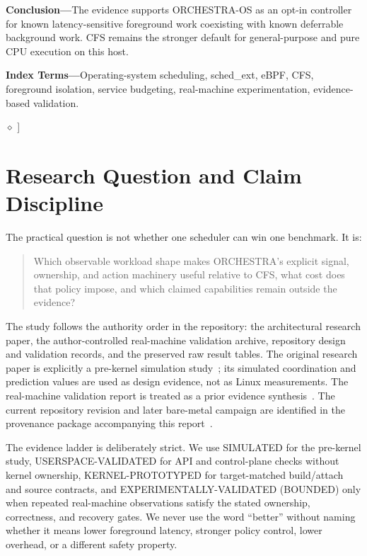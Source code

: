 \documentclass[10pt,letterpaper,twocolumn]{article}
\newcommand{\ORCH}{ORCHESTRA-OS}
\newcommand{\evidence}[1]{\textsf{\scriptsize #1}}
\begin{document}
\begin{minipage}{0.965\textwidth}
\vspace{0.16em}\noindent\textbf{Conclusion---}The evidence supports \ORCH{} as an opt-in controller for known latency-sensitive foreground work coexisting with known deferrable background work. CFS remains the stronger default for general-purpose and pure CPU execution on this host.\par
\vspace{0.18em}\noindent\textbf{Index Terms---}Operating-system scheduling, sched\_ext, eBPF, CFS, foreground isolation, service budgeting, real-machine experimentation, evidence-based validation.
\end{minipage}
\vspace{0.3em}
\hrulefill\quad$\diamond$\quad\hrulefill
\vspace{0.22em}
]

\section{Research Question and Claim Discipline}

The practical question is not whether one scheduler can win one benchmark. It is:

\begin{quote}\small
Which observable workload shape makes ORCHESTRA's explicit signal, ownership, and action machinery useful relative to CFS, what cost does that policy impose, and which claimed capabilities remain outside the evidence?
\end{quote}

The study follows the authority order in the repository: the architectural research paper, the author-controlled real-machine validation archive, repository design and validation records, and the preserved raw result tables. The original research paper is explicitly a pre-kernel simulation study~\cite{simpaper}; its simulated coordination and prediction values are used as design evidence, not as Linux measurements. The real-machine validation report is treated as a prior evidence synthesis~\cite{valpaper}. The current repository revision and later bare-metal campaign are identified in the provenance package accompanying this report~\cite{repo}.

The evidence ladder is deliberately strict. We use \evidence{SIMULATED} for the pre-kernel study, \evidence{USERSPACE-VALIDATED} for API and control-plane checks without kernel ownership, \evidence{KERNEL-PROTOTYPED} for target-matched build/attach and source contracts, and \evidence{EXPERIMENTALLY-VALIDATED (BOUNDED)} only when repeated real-machine observations satisfy the stated ownership, correctness, and recovery gates. We never use the word ``better'' without naming whether it means lower foreground latency, stronger policy control, lower overhead, or a different safety property.
\end{document}
